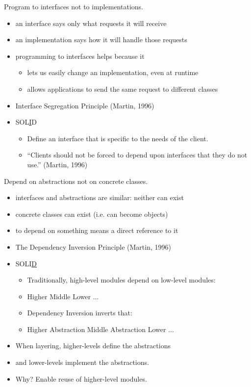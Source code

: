 \documentclass{beamer}
\begin{document}
\begin{frame}{Program to interfaces not to implementations.}
    \begin{itemize}
        \item an interface says only what requests it will receive
        \item an implementation says how it will handle those requests
        \item programming to interfaces helps because it
            \begin{itemize}
                \item lets us easily change an implementation, even at runtime
                \item allows applications to send the same request to different classes
            \end{itemize}
        \item Interface Segregation Principle (Martin, 1996)
        \item SOL\underline{I}D %
            \begin{itemize}
                \item Define an interface that is specific to the needs of the client.
                \item ``Clients should not be forced to depend upon interfaces that they do not use.'' (Martin, 1996)
            \end{itemize}
    \end{itemize}
\end{frame}

\begin{frame}{Depend on abstractions not on concrete classes.}
    \begin{itemize}
        \item interfaces and abstractions are similar: neither can exist
        \item concrete classes can exist (i.e. can become objects)
        \item to depend on something means a direct reference to it
        \item The Dependency Inversion Principle (Martin, 1996)
        \item SOLI\underline{D} %
        \begin{itemize}
            \item Traditionally, high-level modules depend on low-level modules:
            \item Higher \textrightarrow{} Middle \textrightarrow{} Lower \textrightarrow{} ...
            \item Dependency Inversion inverts that:
            \item Higher \textrightarrow{} Abstraction \textleftarrow{} Middle \textrightarrow{} Abstraction \textleftarrow{} Lower ...
        \end{itemize}
        \item When layering, higher-levels define the abstractions
        \item and lower-levels implement the abstractions.
        \item Why? Enable reuse of higher-level modules.
    \end{itemize}
\end{frame}
\end{document}
